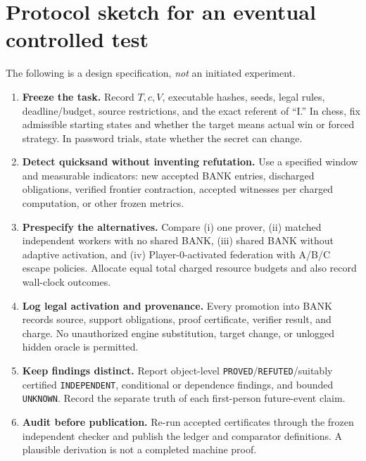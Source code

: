 \documentclass[11pt,letterpaper]{article}
\begin{document}
\section{Protocol sketch for an eventual controlled test}
The following is a design specification, \emph{not} an initiated experiment.
\begin{enumerate}
\item \textbf{Freeze the task.} Record $T,c,V$, executable hashes, seeds, legal rules, deadline/budget, source restrictions, and the exact referent of ``I.'' In chess, fix admissible starting states and whether the target means actual win or forced strategy. In password trials, state whether the secret can change.
\item \textbf{Detect quicksand without inventing refutation.} Use a specified window and measurable indicators: new accepted BANK entries, discharged obligations, verified frontier contraction, accepted witnesses per charged computation, or other frozen metrics.
\item \textbf{Prespecify the alternatives.} Compare (i) one prover, (ii) matched independent workers with no shared BANK, (iii) shared BANK without adaptive activation, and (iv) Player-0-activated federation with A/B/C escape policies. Allocate equal total charged resource budgets and also record wall-clock outcomes.
\item \textbf{Log legal activation and provenance.} Every promotion into BANK records source, support obligations, proof certificate, verifier result, and charge. No unauthorized engine substitution, target change, or unlogged hidden oracle is permitted.
\item \textbf{Keep findings distinct.} Report object-level \texttt{PROVED}/\texttt{REFUTED}/suitably certified \texttt{INDEPENDENT}, conditional or dependence findings, and bounded \texttt{UNKNOWN}. Record the separate truth of each first-person future-event claim.
\item \textbf{Audit before publication.} Re-run accepted certificates through the frozen independent checker and publish the ledger and comparator definitions. A plausible derivation is not a completed machine proof.
\end{enumerate}
\end{document}
